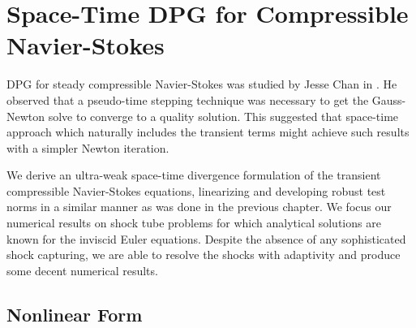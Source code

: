 \documentclass[Dissertation.tex]{subfiles}
\begin{document}
\graphicspath{{../Figures/}}
\chapter{Space-Time DPG for Compressible Navier-Stokes}
\label{sec:compressible}

DPG for steady compressible Navier-Stokes was studied by Jesse Chan in \cite{JesseDissertation}.
He observed that a pseudo-time stepping technique was necessary to get the Gauss-Newton solve to converge 
to a quality solution.
This suggested that space-time approach which naturally includes the transient terms
might achieve such results with a simpler Newton iteration.

We derive an ultra-weak space-time divergence formulation of the transient compressible Navier-Stokes equations,
linearizing and developing robust test norms in a similar manner as was done in the previous chapter.
We focus our numerical results on shock tube problems for which analytical solutions are known for the 
inviscid Euler equations.
Despite the absence of any sophisticated shock capturing, we are able to resolve the shocks with adaptivity 
and produce some decent numerical results.

\section{Nonlinear Form}
\end{document}
